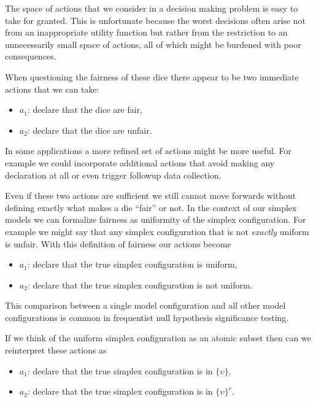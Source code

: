 \documentclass[
  letterpaper,
  DIV=11,
  numbers=noendperiod]{scrartcl}
\providecommand{\tightlist}{%
  \setlength{\itemsep}{0pt}\setlength{\parskip}{0pt}}\usepackage{longtable,booktabs,array}
\begin{document}
The space of actions that we consider in a decision making problem is
easy to take for granted. This is unfortunate because the worst
decisions often arise not from an inappropriate utility function but
rather from the restriction to an unnecessarily small space of actions,
all of which might be burdened with poor consequences.

When questioning the fairness of these dice there appear to be two
immediate actions that we can take:

\begin{itemize}
\tightlist
\item
  \(a_{1}\): declare that the dice are fair,
\item
  \(a_{2}\): declare that the dice are unfair.
\end{itemize}

In some applications a more refined set of actions might be more useful.
For example we could incorporate additional actions that avoid making
any declaration at all or even trigger followup data collection.

Even if these two actions are sufficient we still cannot move forwards
without defining exactly what makes a die ``fair'' or not. In the
context of our simplex models we can formalize fairness as uniformity of
the simplex configuration. For example we might say that any simplex
configuration that is not \emph{exactly} uniform is unfair. With this
definition of fairness our actions become

\begin{itemize}
\tightlist
\item
  \(a_{1}\): declare that the true simplex configuration is uniform,
\item
  \(a_{2}\): declare that the true simplex configuration is not uniform.
\end{itemize}

This comparison between a single model configuration and all other model
configurations is common in frequentist null hypothesis significance
testing.

If we think of the uniform simplex configuration as an atomic subset
then can we reinterpret these actions as

\begin{itemize}
\tightlist
\item
  \(a_{1}\): declare that the true simplex configuration is in
  \(\{ \upsilon \}\),
\item
  \(a_{2}\): declare that the true simplex configuration is in
  \(\{ \upsilon \}^{c}\).
\end{itemize}
\end{document}
